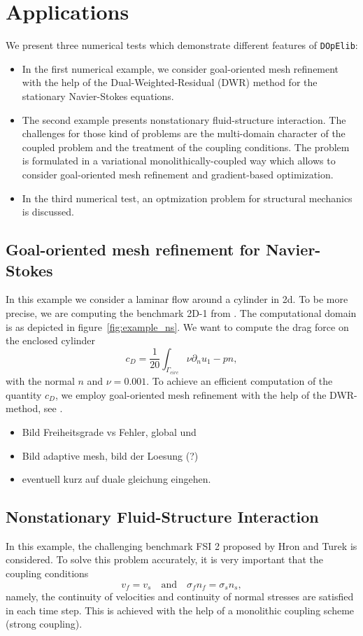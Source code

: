 \documentclass[prodmode,acmtoms]{acmsmall}
\numberwithin{equation}{section}
\newcommand{\dope}{\texttt{DOpElib}}
\begin{document}
\section{Applications}
\label{applications}
We present three numerical tests which demonstrate different
features of \dope{}:
\begin{itemize}
\item In the first numerical example, we consider 
goal-oriented mesh refinement with the help of the 
Dual-Weighted-Residual (DWR) method for the stationary Navier-Stokes equations.
\item The second example presents nonstationary fluid-structure 
interaction. The challenges for those kind of problems are the multi-domain
character of the coupled problem and the treatment of the coupling conditions.
The problem is formulated in a variational monolithically-coupled way which 
allows to consider goal-oriented mesh refinement and gradient-based optimization.
\item In the third numerical test, an optmization problem for structural mechanics
is discussed.
\end{itemize}

\subsection{Goal-oriented mesh refinement for Navier-Stokes}
In this example we consider a laminar flow around a cylinder in 2d. To be more precise, we are computing the benchmark 2D-1 from \cite{TuSchae96}. The computational domain is as depicted in figure~\ref{fig:example_ns}. We want to compute the drag force on the enclosed cylinder
\begin{equation}
c_D = \frac 1 {20} \int_{\Gamma_{circ}} \nu\partial_nu _1 - pn,
\end{equation}
with the normal $n$ and $\nu = 0.001$. To achieve an efficient computation of the quantity $c_D$, we employ goal-oriented mesh refinement with the help of the DWR-method, see \cite{BeRa96}.

\begin{itemize}
\item Bild Freiheitsgrade vs Fehler, global und 
\item Bild adaptive mesh, bild der Loesung (?)
\item eventuell kurz auf duale gleichung eingehen.
\end{itemize}

\subsection{Nonstationary Fluid-Structure Interaction}
In this example, the challenging benchmark FSI 2
proposed by Hron and Turek \cite{HrTu06b} is considered.
To solve this problem accurately, it is very important that 
the coupling conditions
\[
v_f = v_s \quad \text{and} \quad \sigma_f n_f = \sigma_s n_s, 
\]
namely, the continuity of velocities and continuity of normal stresses
are satisfied in each time step. This is achieved with the help of 
a monolithic coupling scheme (strong coupling).
\end{document}
